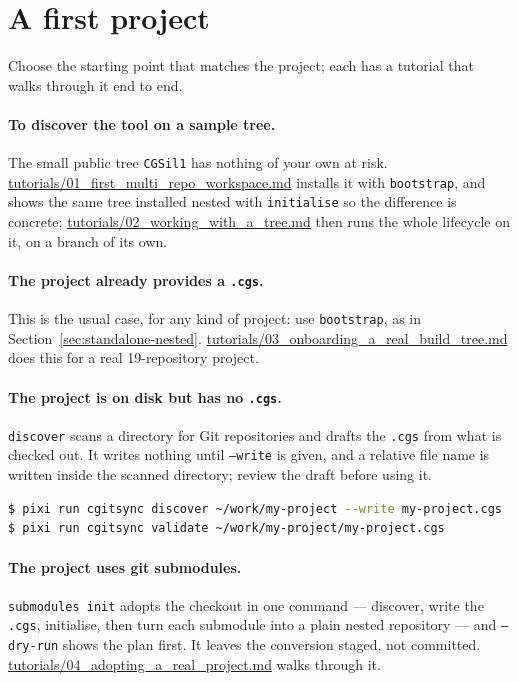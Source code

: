 \section{A first project}

Choose the starting point that matches the project; each has a tutorial
that walks through it end to end.

\paragraph{To discover the tool on a sample tree.} The small public tree
\texttt{CGSil1} has nothing of your own at risk.
\url{tutorials/01_first_multi_repo_workspace.md} installs it with
\texttt{bootstrap}, and shows the same tree installed nested with
\texttt{initialise} so the difference is concrete;
\url{tutorials/02_working_with_a_tree.md} then runs the whole lifecycle on
it, on a branch of its own.

\paragraph{The project already provides a \texttt{.cgs}.} This is the usual
case, for any kind of project: use \texttt{bootstrap}, as in
Section~\ref{sec:standalone-nested}.
\url{tutorials/03_onboarding_a_real_build_tree.md} does this for a real
19-repository project.

\paragraph{The project is on disk but has no \texttt{.cgs}.} \texttt{discover}
scans a directory for Git repositories and drafts the \texttt{.cgs} from what
is checked out. It writes nothing until \texttt{--write} is given, and a
relative file name is written inside the scanned directory; review the draft
before using it.

\begin{lstlisting}[language=bash]
$ pixi run cgitsync discover ~/work/my-project --write my-project.cgs
$ pixi run cgitsync validate ~/work/my-project/my-project.cgs
\end{lstlisting}

\paragraph{The project uses git submodules.} \texttt{submodules init} adopts
the checkout in one command --- discover, write the \texttt{.cgs},
initialise, then turn each submodule into a plain nested repository --- and
\texttt{--dry-run} shows the plan first. It leaves the conversion staged, not
committed. \url{tutorials/04_adopting_a_real_project.md} walks through
it.

